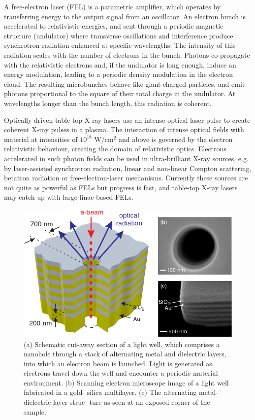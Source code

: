 A free-electron laser (FEL) is a parametric amplifier, which operates by
transferring energy to the output signal from an oscillator. An electron bunch
is accelerated to relativistic energies, and sent through a periodic magnetic
structure (undulator) where transverse oscillations and interference produce
synchrotron radiation enhanced at specific wavelengths. The intensity of this
radiation scales with the number of electrons in the bunch. Photons co-propagate
with the relativistic electrons and, if the undulator is long enough, induce an
energy modulation, leading to a periodic density modulation in the electron
cloud. The resulting microbunches behave like giant charged particles, and emit
photons proportional to the square of their total charge in the undulator. At
wavelengths longer than the bunch length, this radiation is coherent.

Optically driven table-top X-ray lasers use an intense optical laser pulse to
create coherent X-ray pulses in a plasma. The interaction of intense optical
fields with material at intensities of $10^{18}$ W/cm$^2$ and above is governed by the
electron relativistic behaviour, creating the domain of relativistic
optics. Electrons accelerated in such photon fields can be used in
ultra-brilliant X-ray sources, e.g. by laser-assisted synchrotron radiation,
linear and non-linear Compton scattering, betatron radiation or
free-electron-laser mechanisms. 
Currently these sources are not quite as powerful as FELs but
progress is fast, and table-top X-ray lasers may catch up with large linac-based
FELs. 

\begin{figure}[h]
\centering
  \includegraphics[width=0.6 \columnwidth]{FEL_on_a_chip.png}
  \caption{(a) Schematic cut-away section of a light
well, which comprises a nanohole through a stack of alternating
metal and dielectric layers, into which an electron beam is
launched. Light is generated as electrons travel down the well
and encounter a periodic material environment. (b) Scanning
electron microscope image of a light well fabricated in a gold-
silica multilayer. (c) The alternating metal-dielectric layer struc-
ture as seen at an exposed corner of the sample. \cite{Adamo2009Light}
}
\label{Fig:FEL_Chip}
\end{figure} 

